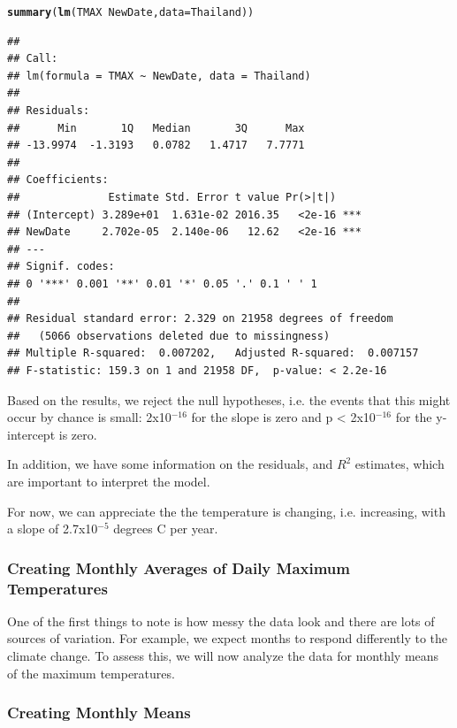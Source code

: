 \documentclass{article}\usepackage[]{graphicx}\usepackage[]{color}
\makeatletter
\newcommand{\hlopt}[1]{\textcolor[rgb]{0,0,0}{#1}}%
\newcommand{\hlstd}[1]{\textcolor[rgb]{0.345,0.345,0.345}{#1}}%
\newcommand{\hlkwc}[1]{\textcolor[rgb]{0.333,0.667,0.333}{#1}}%
\newcommand{\hlkwd}[1]{\textcolor[rgb]{0.737,0.353,0.396}{\textbf{#1}}}%
\newenvironment{kframe}{%
 \def\at@end@of@kframe{}%
 \ifinner\ifhmode%
  \def\at@end@of@kframe{\end{minipage}}%
  \begin{minipage}{\columnwidth}%
 \fi\fi%
 \def\FrameCommand##1{\hskip\@totalleftmargin \hskip-\fboxsep
 \colorbox{shadecolor}{##1}\hskip-\fboxsep
     \hskip-\linewidth \hskip-\@totalleftmargin \hskip\columnwidth}%
 \MakeFramed {\advance\hsize-\width
   \@totalleftmargin\z@ \linewidth\hsize
   \@setminipage}}%
 {\par\unskip\endMakeFramed%
 \at@end@of@kframe}
\newenvironment{knitrout}{}{} %
\makeatother
\begin{document}
\begin{knitrout}
\color{fgcolor}\begin{kframe}
\begin{alltt}
\hlkwd{summary}\hlstd{(}\hlkwd{lm}\hlstd{(TMAX} \hlopt{~} \hlstd{NewDate,} \hlkwc{data}\hlstd{=Thailand))}
\end{alltt}
\begin{verbatim}
## 
## Call:
## lm(formula = TMAX ~ NewDate, data = Thailand)
## 
## Residuals:
##      Min       1Q   Median       3Q      Max 
## -13.9974  -1.3193   0.0782   1.4717   7.7771 
## 
## Coefficients:
##              Estimate Std. Error t value Pr(>|t|)    
## (Intercept) 3.289e+01  1.631e-02 2016.35   <2e-16 ***
## NewDate     2.702e-05  2.140e-06   12.62   <2e-16 ***
## ---
## Signif. codes:  
## 0 '***' 0.001 '**' 0.01 '*' 0.05 '.' 0.1 ' ' 1
## 
## Residual standard error: 2.329 on 21958 degrees of freedom
##   (5066 observations deleted due to missingness)
## Multiple R-squared:  0.007202,	Adjusted R-squared:  0.007157 
## F-statistic: 159.3 on 1 and 21958 DF,  p-value: < 2.2e-16
\end{verbatim}
\end{kframe}
\end{knitrout}

Based on the results, we reject the null hypotheses, i.e. the events that this might occur by chance is small: 2x10$^{-16}$ for the slope is zero and p < 2x10$^{-16}$ for the y-intercept is zero. 

In addition, we have some information on the residuals, and $R^2$ estimates, which are important to interpret the model. 

For now, we can appreciate the the temperature is changing, i.e. increasing, with a slope of 2.7x10$^{-5}$ degrees C per year. 

\subsubsection{Creating Monthly Averages of Daily Maximum Temperatures}

One of the first things to note is how messy the data look and there are lots of sources of variation. For example, we expect months to respond differently to the climate change. To assess this, we will now analyze the data for monthly means of the maximum temperatures.

\subsubsection{Creating Monthly Means}
\end{document}
